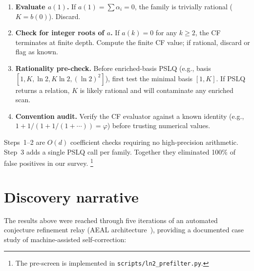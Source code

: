 \documentclass[11pt]{amsart}
\theoremstyle{definition}
\theoremstyle{remark}
\begin{document}
\begin{enumerate}
  \item \textbf{Evaluate $a(1)$.}
    If $a(1) = \sum\alpha_i = 0$, the family is trivially rational
    ($K=b(0)$).  Discard.

  \item \textbf{Check for integer roots of $a$.}
    If $a(k)=0$ for any $k\ge 2$, the CF terminates at finite depth.
    Compute the finite CF value; if rational, discard or flag as known.

  \item \textbf{Rationality pre-check.}
    Before enriched-basis PSLQ
    (e.g., basis $[1, K, \ln 2, K\ln 2, (\ln 2)^2]$),
    first test the minimal basis $[1, K]$.  If PSLQ returns a relation,
    $K$ is likely rational and will contaminate any enriched scan.

  \item \textbf{Convention audit.}
    Verify the CF evaluator against a known identity
    (e.g., $1+1/(1+1/(1+\cdots)) = \varphi$)
    before trusting numerical values.
\end{enumerate}

Steps~1--2 are $O(d)$ coefficient checks requiring no high-precision
arithmetic.
Step~3 adds a single PSLQ call per family.
Together they eliminated 100\% of false positives in our survey.%
\footnote{The pre-screen is implemented in
  \texttt{scripts/ln2\_prefilter.py}.}

\section{Discovery narrative}\label{sec:discovery}

The results above were reached through five iterations of an automated
conjecture refinement relay (AEAL architecture~\cite{aeal-paper7,aeal-paper8}),
providing a documented case study of machine-assisted self-correction:
\end{document}
